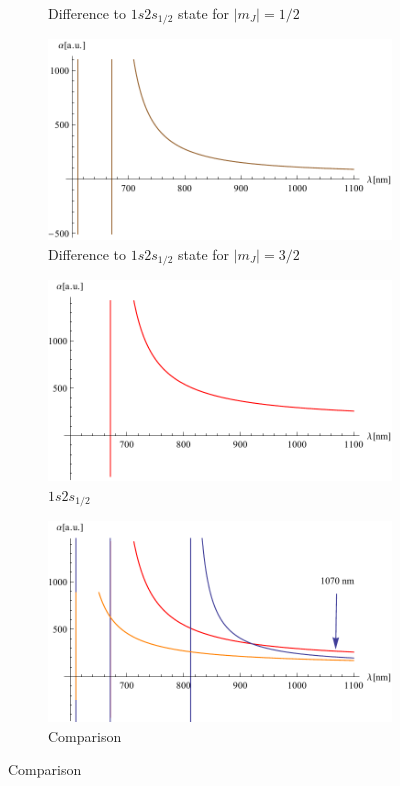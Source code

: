 \begin{figure}[H]
\begin{subfigure}[b]{0.4\textwidth}
                \caption{Difference to $1s2s_{1/2}$ state for $|m_J|=1/2$}
\end{subfigure}
\begin{subfigure}[b]{0.4\textwidth}
                \includegraphics[width=\textwidth]{alphadiff32}
                \caption{Difference to $1s2s_{1/2}$ state for $|m_J|=3/2$}
\end{subfigure}
\begin{subfigure}[b]{0.4\textwidth}
                \includegraphics[width=\textwidth]{alphaground}
                \caption{$1s2s_{1/2}$}
\end{subfigure}
\begin{subfigure}[b]{0.4\textwidth}
                \includegraphics[width=\textwidth]{alphaalltogether}
                \caption{Comparison}
\end{subfigure}





\end{figure}
